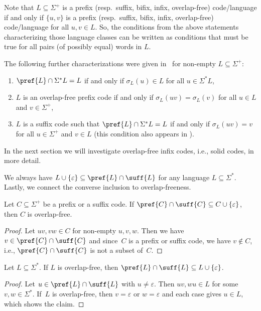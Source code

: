 Note that $L \subseteq \Sigma^+$ is a prefix (resp.~suffix, bifix, infix, overlap-free) code/language
if and only if $\{u,v\}$ is a prefix (resp.~suffix, bifix, infix, overlap-free) code/language
for all $u,v \in L$. So, the conditions from the above statements characterizing those language classes
can be written as conditions that must be true for all pairs (of possibly equal) words in $L$.

The following further characterizations were given in~\cite{DBLP:journals/tcs/JurgensenS21}
for non-empty $L \subseteq \Sigma^+$: 
\begin{enumerate}
	\item $\pref{L}\cap \Sigma^*L = L$ if and only if $\sigma_L(u) \in L$ for all $u \in \Sigma^*L$,
	
	\item $L$ is an overlap-free prefix code if and only if $\sigma_L(uv) = \sigma_L(v)$
	for all $u \in L$ and $v \in \Sigma^+$,
	
	\item $L$ is a suffix code such that $\pref{L} \cap \Sigma^*L = L$ if and only if $\sigma_L(uv) = v$
	for all $u \in \Sigma^+$ and $v \in L$ (this condition also appears in ).
\end{enumerate}

In the next section we will investigate overlap-free infix codes, i.e., solid codes, in more detail.

We always have $L \cup \{\varepsilon\} \subseteq \pref{L} \cap \suff{L}$
for any language $L \subseteq \Sigma^*$. Lastly, we connect
the converse inclusion to overlap-freeness.

\begin{proposition}  \label{constrsync:prop:pref-suff-overlap-free-inclusion-eqn}
	Let $C \subseteq \Sigma^+$ be a prefix or a suffix code.
	If $\pref{C} \cap \suff{C} \subseteq C \cup \{\varepsilon\}$,
	then $C$ is overlap-free.
\end{proposition}
\begin{proof}
	Let $uv, vw \in C$ for non-empty $u,v,w$.
	Then we have $v \in \pref{C} \cap \suff{C}$
	and since~$C$ is a prefix or suffix code, we have $v \notin C$, i.e.,
	$\pref{C} \cap \suff{C}$
	is not a subset of~$C$.
\end{proof}

\begin{proposition} \label{constrsync:prop:overlap-free-inclusion-eqn}
	Let $L \subseteq \Sigma^*$.
	If $L$ is overlap-free,
	then $\pref{L} \cap \suff{L} \subseteq L \cup \{\varepsilon\}$.
\end{proposition}
\begin{proof}
	Let $u \in \pref{L}\cap \suff{L}$ with $u \ne \varepsilon$.
	Then $uv, wu \in L$ for some $v,w \in \Sigma^*$.
	If~$L$ is overlap-free, then $v = \varepsilon$
	or $w = \varepsilon$ and each case gives $u \in L$,
	which shows the claim.	
\end{proof}

